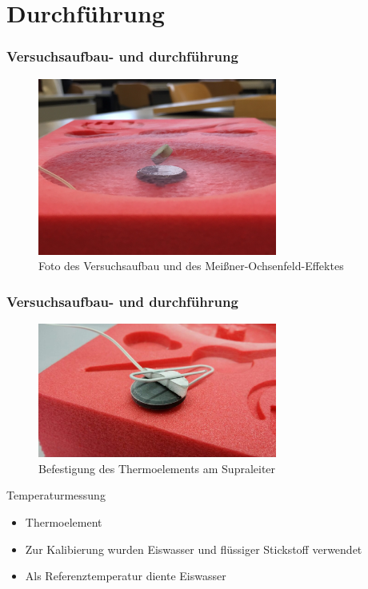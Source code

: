 \section{Durchführung}
\begin{frame}
  \frametitle{Versuchsaufbau- und durchführung}
\begin{figure}
  \centering
  \includegraphics[width=0.7\textwidth]{bilder/versuchsaufbau.jpg}
\caption{Foto des Versuchsaufbau und des Meißner-Ochsenfeld-Effektes }
  \label{fig: versuchsaufbau}
\end{figure}
\end{frame}
\begin{frame}
  \frametitle{Versuchsaufbau- und durchführung}
\begin{figure}
  \centering
  \includegraphics[width=0.7\textwidth]{bilder/versuchsaufbau_2.JPG}
\caption{Befestigung des Thermoelements am Supraleiter}
  \label{fig: versuchsaufbau_2}
\end{figure}
\end{frame}
\begin{frame}{Temperaturmessung}
    \begin{itemize}
      \item{Thermoelement}
      \item{Zur Kalibierung wurden Eiswasser und flüssiger Stickstoff verwendet}
      \item{Als Referenztemperatur diente Eiswasser}
    \end{itemize}
\end{frame}
